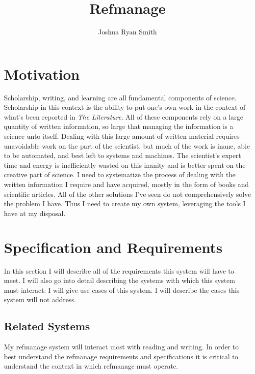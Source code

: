 \documentclass[letterpaper,12pt]{article}
\title{Refmanage}
\author{Joshua Ryan Smith}
\begin{document}
\maketitle




\section{Motivation}
Scholarship, writing, and learning are all fundamental components of science. Scholarship in this context is the ability to put one's own work in the context of what's been reported in \emph{The Literature}. All of these components rely on a large quantity of written information, so large that managing the information is a science unto itself. Dealing with this large amount of written material requires unavoidable work on the part of the scientist, but much of the work is inane, able to be automated, and best left to systems and machines. The scientist's expert time and energy is inefficiently wasted on this inanity and is better spent on the creative part of science. I need to systematize the process of dealing with the written information I require and have acquired, mostly in the form of books and scientific articles. All of the other solutions I've seen do not comprehensively solve the problem I have. Thus I need to create my own system, leveraging the tools I have at my disposal.









\section{Specification and Requirements}
In this section I will describe all of the requirements this system will have to meet. I will also go into detail describing the systems with which this system must interact. I will give use cases of this system. I will describe the cases this system will not address.

\subsection{Related Systems}
My refmanage system will interact most with reading and writing. In order to best understand the refmanage requirements and specifications it is critical to understand the context in which refmanage must operate.
\end{document}

